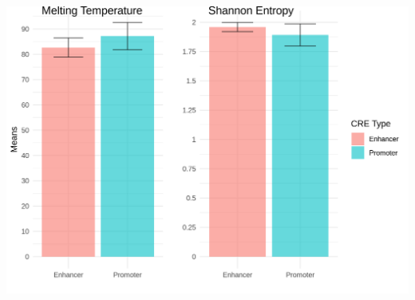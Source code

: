 \documentclass[
  letterpaper,
  DIV=11,
  numbers=noendperiod]{scrartcl}
\begin{document}
\includegraphics{gb-test-pdf_files/figure-pdf/unnamed-chunk-22-1.png}
\end{document}
